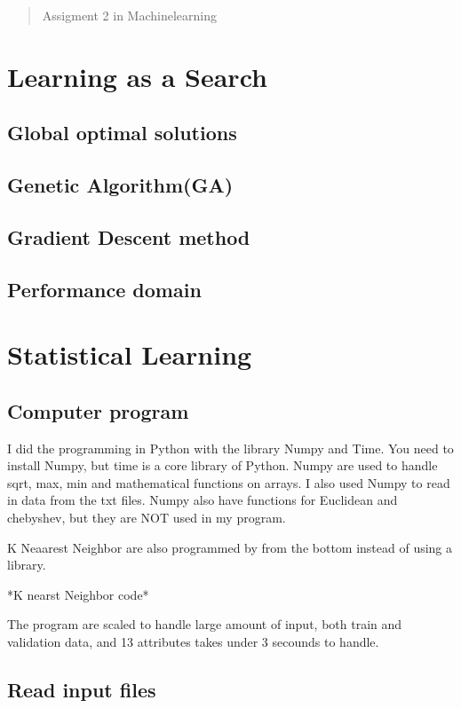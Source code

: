 \documentclass[a4paper,12pt,pdftex]{article}
\begin{document}
\begin{abstract}

    Assigment 2 in Machinelearning

\end{abstract}

\section{Learning as a Search}
\subsection{Global optimal solutions}
\subsection{Genetic Algorithm(GA)}
\subsection{Gradient Descent method}
\subsection{Performance domain}

\section{Statistical Learning}
\subsection{Computer program}
I did the programming in Python with the library Numpy and Time. You need to install Numpy, but time is a core
library of Python. Numpy are used to handle sqrt, max, min and mathematical functions on arrays. I also used Numpy
to read in data from the txt files. Numpy also have functions for Euclidean and chebyshev, but they are NOT used in my program.

K Neaarest Neighbor are also programmed by from the bottom instead of using a library. 

*K nearst Neighbor code*

The program are scaled to handle large amount of input, both train and validation data, and 13 attributes takes under 3 secounds to handle.

\subsection{Read input files}
\end{document}
